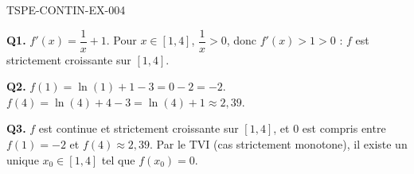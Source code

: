 \begin{corrige}{TSPE-CONTIN-EX-004}

\textbf{Q1.} $f'(x) = \dfrac{1}{x} + 1$. Pour $x \in [1,4]$, $\dfrac{1}{x} > 0$, donc $f'(x) > 1 > 0$ : $f$ est strictement croissante sur $[1,4]$.

\textbf{Q2.} $f(1) = \ln(1) + 1 - 3 = 0 - 2 = -2$. $f(4) = \ln(4) + 4 - 3 = \ln(4)+1 \approx 2{,}39$.

\textbf{Q3.} $f$ est continue et strictement croissante sur $[1,4]$, et $0$ est compris entre $f(1)=-2$ et $f(4)\approx 2{,}39$. Par le TVI (cas strictement monotone), il existe un unique $x_0 \in [1,4]$ tel que $f(x_0)=0$.

\end{corrige}
